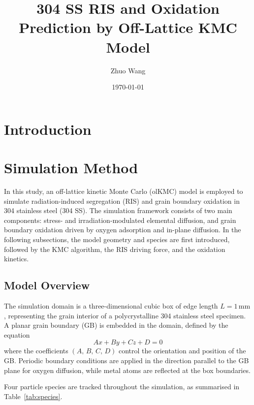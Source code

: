 \documentclass[12pt]{article}
\title{304 SS RIS and Oxidation Prediction by Off-Lattice KMC Model}
\author{Zhuo Wang}
\date{\today}
\begin{document}
\maketitle

\section{Introduction}


\section{Simulation Method} \label{sec:method}

In this study, an off-lattice kinetic Monte Carlo (olKMC) model is employed to simulate radiation-induced segregation (RIS) and grain boundary oxidation in 304 stainless steel (304 SS). The simulation framework consists of two main components: stress- and irradiation-modulated elemental diffusion, and grain boundary oxidation driven by oxygen adsorption and in-plane diffusion. In the following subsections, the model geometry and species are first introduced, followed by the KMC algorithm, the RIS driving force, and the oxidation kinetics.

\subsection{Model Overview} \label{sec:overview}

The simulation domain is a three-dimensional cubic box of edge length $L = 1\,\mathrm{mm}$, representing the grain interior of a polycrystalline 304 stainless steel specimen. A planar grain boundary (GB) is embedded in the domain, defined by the equation
\begin{equation}\label{equ:gbplane}
Ax + By + Cz + D = 0
\end{equation}
where the coefficients $(A,\,B,\,C,\,D)$ control the orientation and position of the GB. Periodic boundary conditions are applied in the direction parallel to the GB plane for oxygen diffusion, while metal atoms are reflected at the box boundaries.

Four particle species are tracked throughout the simulation, as summarised in Table~\ref{tab:species}.
\end{document}
